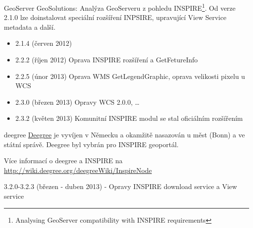 \documentclass[xcolor=dvipsnames]{beamer}
\begin{document}
\begin{frame}{GeoServer}
    GeoSolutions: Analýza GeoServeru z pohledu
    INSPIRE\footnote{{Analysing GeoServer compatibility with INSPIRE requirements}}.
Od verze 2.1.0 lze doinstalovat speciální rozšíření INPSIRE, upravující View
Service metadata a další.
    \begin{itemize}
        \item 2.1.4 (červen 2012)
            \pause
        \item 2.2.2 (říjen 2012) Oprava INSPIRE rozšíření a GetFetureInfo
            \pause
        \item 2.2.5 (únor 2013) Oprava WMS GetLegendGraphic, oprava velikosti
        pixelu u WCS
            \pause
        \item 2.3.0 (březen 2013) Opravy WCS 2.0.0, \dots
            \pause
        \item 2.3.2 (květen 2013) Komunitní INSPIRE modul se stal oficiálním
            rozšířením
    \end{itemize}
\end{frame}


\begin{frame}{deegree}
\href{http://deegree.org}{Deegree} je vyvíjen v Německu a okamžitě nasazován u měst (Bonn) a ve státní
správě. Deegree byl vybrán pro INSPIRE geoportál.

Více informací o deegree a INSPIRE na
\url{http://wiki.deegree.org/deegreeWiki/InspireNode}

3.2.0-3.2.3 (březen - duben 2013) - Opravy INSPIRE download service a View service
\end{frame}
\end{document}
